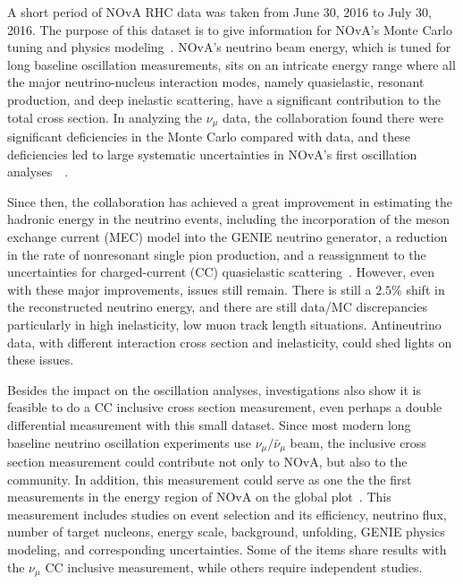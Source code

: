 \documentclass[a4paper, 11pt]{article} %
\begin{document}
A short period of NOvA RHC data was taken from June 30, 2016 to July 30, 2016. The purpose of this dataset is to give information for NOvA's Monte Carlo tuning and physics modeling~\cite{Patterson:2016_1}. NOvA's neutrino beam energy, which is tuned for long baseline oscillation measurements, sits on an intricate energy range where all the major neutrino-nucleus interaction modes, namely quasielastic, resonant production, and deep inelastic scattering, have a significant contribution to the total cross section. In analyzing the $\nu_\mu$ data, the collaboration found there were significant deficiencies in the Monte Carlo compared with data, and these deficiencies led to large systematic uncertainties in NOvA's first oscillation analyses~\cite{NOvA:2016_1}~\cite{NOvA:2016_2}.

Since then, the collaboration has achieved a great improvement in estimating the hadronic energy in the neutrino events, including the incorporation of the meson exchange current (MEC) model into the GENIE neutrino generator, a reduction in the rate of nonresonant single pion production, and a reassignment to the uncertainties for charged-current (CC) quasielastic scattering~\cite{Wolcott:2016_1}. However, even with these major improvements, issues still remain. There is still a $2.5\%$ shift in the reconstructed neutrino energy, and there are still data/MC discrepancies particularly in  high inelasticity, low muon track length situations. Antineutrino data, with different interaction cross section and inelasticity, could shed lights on these issues.

Besides the impact on the oscillation analyses, investigations also show it is feasible to do a CC inclusive cross section measurement, even perhaps a double differential measurement with this small dataset. Since most modern long baseline neutrino oscillation experiments use $\nu_\mu/\bar{\nu}_\mu$ beam, the inclusive cross section measurement could contribute not only to NOvA, but also to the community. In addition, this measurement could serve as one the the first measurements in the energy region of NOvA on the global plot~\cite{Zeller:2015_1}. This measurement includes studies on event selection and its efficiency, neutrino flux, number of target nucleons, energy scale, background, unfolding, GENIE physics modeling, and corresponding uncertainties. Some of the items share results with the $\nu_\mu$ CC inclusive measurement, while others require independent studies.
\end{document}
